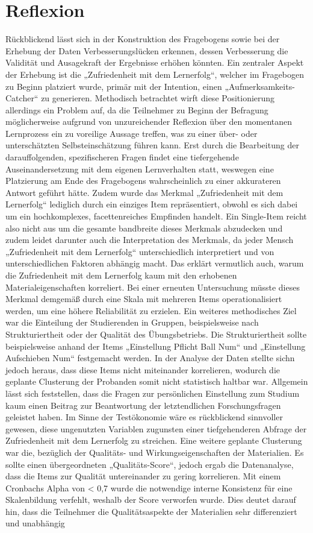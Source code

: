 \documentclass[a4paper, 12pt]{article}
\begin{document}
\section{Reflexion}
Rückblickend lässt sich in der Konstruktion des Fragebogens sowie bei der Erhebung der Daten Verbesserungslücken erkennen, dessen Verbesserung die Validität und Ausagekraft der Ergebnisse erhöhen könnten. Ein zentraler Aspekt der Erhebung ist die „Zufriedenheit mit dem Lernerfolg“, welcher im Fragebogen zu Beginn platziert wurde, primär mit der Intention, einen „Aufmerksamkeits-Catcher“ zu generieren. Methodisch betrachtet wirft diese Positionierung allerdings ein Problem auf, da die Teilnehmer zu Beginn der Befragung möglicherweise aufgrund von unzureichender Reflexion über den momentanen Lernprozess ein zu voreilige Aussage treffen, was zu einer über- oder unterschätzten Selbsteinschätzung führen kann. Erst durch die Bearbeitung der darauffolgenden, spezifischeren Fragen findet eine tiefergehende Auseinandersetzung mit dem eigenen Lernverhalten statt, weswegen eine Platzierung am Ende des Fragebogens wahrscheinlich zu einer akkurateren Antwort geführt hätte. Zudem wurde das Merkmal „Zufriedenheit mit dem Lernerfolg“ lediglich durch ein einziges Item repräsentiert, obwohl es sich dabei um ein hochkomplexes, facettenreiches Empfinden handelt. Ein Single-Item reicht also nicht aus um die gesamte bandbreite dieses Merkmals abzudecken und zudem leidet darunter auch die Interpretation des Merkmals, da jeder Mensch „Zufriedenheit mit dem Lernerfolg“ unterschiedlich interpretiert und von unterschiedlichen Faktoren abhängig macht. Das erklärt vermutlich auch, warum die Zufriedenheit mit dem Lernerfolg kaum mit den erhobenen Materialeigenschaften korreliert. Bei einer erneuten Untersuchung müsste dieses Merkmal demgemäß durch eine Skala mit mehreren Items operationalisiert werden, um eine höhere Reliabilität zu erzielen. Ein weiteres methodisches Ziel war die Einteilung der Studierenden in Gruppen, beispielsweise nach Strukturiertheit oder der Qualität des Übungsbetriebs. Die Strukturiertheit sollte beispielsweise anhand der Items „Einstellung Pflicht Ball Num“ und „Einstellung Aufschieben Num“ festgemacht werden. In der Analyse der Daten stellte sichn jedoch heraus, dass diese Items nicht miteinander korrelieren, wodurch die geplante Clusterung der Probanden somit nicht statistisch haltbar war. Allgemein lässt sich feststellen, dass die Fragen zur persönlichen Einstellung zum Studium kaum einen Beitrag zur Beantwortung der letztendlichen Forschungsfragen geleistet haben. Im Sinne der Testökonomie wäre es rückblickend sinnvoller gewesen, diese ungenutzten Variablen zugunsten einer tiefgehenderen Abfrage der Zufriedenheit mit dem Lernerfolg zu streichen. Eine weitere geplante Clusterung war die, bezüglich der Qualitäts- und Wirkungseigenschaften der Materialien. Es sollte einen übergeordneten „Qualitäts-Score“, jedoch ergab die Datenanalyse, dass die Items zur Qualität untereinander zu gering korrelieren. Mit einem Cronbachs Alpha von < 0,7 wurde die notwendige interne Konsistenz für eine Skalenbildung verfehlt, weshalb der Score verworfen wurde. Dies deutet darauf hin, dass die Teilnehmer die Qualitätsaspekte der Materialien sehr differenziert und unabhängig 
\end{document}
